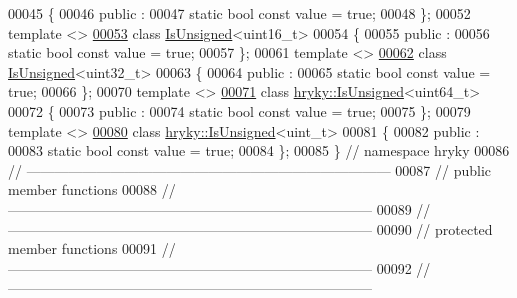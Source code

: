 \begin{DoxyCode}
00045 \{
00046 \textcolor{keyword}{public} :
00047     \textcolor{keyword}{static} \textcolor{keywordtype}{bool} \textcolor{keyword}{const} value = \textcolor{keyword}{true};
00048 \};
00052 \textcolor{keyword}{template} <>
\hypertarget{is__unsigned_8h_source_l00053}{}\hyperlink{classhryky_1_1_is_unsigned_3_01uint16__t_01_4}{00053} \textcolor{keyword}{class }\hyperlink{classhryky_1_1_is_unsigned}{IsUnsigned}<uint16\_t>
00054 \{
00055 \textcolor{keyword}{public} :
00056     \textcolor{keyword}{static} \textcolor{keywordtype}{bool} \textcolor{keyword}{const} value = \textcolor{keyword}{true};
00057 \};
00061 \textcolor{keyword}{template} <>
\hypertarget{is__unsigned_8h_source_l00062}{}\hyperlink{classhryky_1_1_is_unsigned_3_01uint32__t_01_4}{00062} \textcolor{keyword}{class }\hyperlink{classhryky_1_1_is_unsigned}{IsUnsigned}<uint32\_t>
00063 \{
00064 \textcolor{keyword}{public} :
00065     \textcolor{keyword}{static} \textcolor{keywordtype}{bool} \textcolor{keyword}{const} value = \textcolor{keyword}{true};
00066 \};
00070 \textcolor{keyword}{template} <>
\hypertarget{is__unsigned_8h_source_l00071}{}\hyperlink{classhryky_1_1hryky_1_1_is_unsigned_3_01uint64__t_01_4}{00071} \textcolor{keyword}{class }\hyperlink{classhryky_1_1_is_unsigned}{hryky::IsUnsigned}<uint64\_t>
00072 \{
00073 \textcolor{keyword}{public} :
00074     \textcolor{keyword}{static} \textcolor{keywordtype}{bool} \textcolor{keyword}{const} value = \textcolor{keyword}{true};
00075 \};
00079 \textcolor{keyword}{template} <>
\hypertarget{is__unsigned_8h_source_l00080}{}\hyperlink{classhryky_1_1hryky_1_1_is_unsigned_3_01uint__t_01_4}{00080} \textcolor{keyword}{class }\hyperlink{classhryky_1_1_is_unsigned}{hryky::IsUnsigned}<uint\_t>
00081 \{
00082 \textcolor{keyword}{public} :
00083     \textcolor{keyword}{static} \textcolor{keywordtype}{bool} \textcolor{keyword}{const} value = \textcolor{keyword}{true};
00084 \};
00085 \} \textcolor{comment}{// namespace hryky}
00086 \textcolor{comment}{//
      ------------------------------------------------------------------------------}
00087 \textcolor{comment}{// public member functions}
00088 \textcolor{comment}{//
      ------------------------------------------------------------------------------}
00089 \textcolor{comment}{//
      ------------------------------------------------------------------------------}
00090 \textcolor{comment}{// protected member functions}
00091 \textcolor{comment}{//
      ------------------------------------------------------------------------------}
00092 \textcolor{comment}{//
      ------------------------------------------------------------------------------}

\end{DoxyCode}
